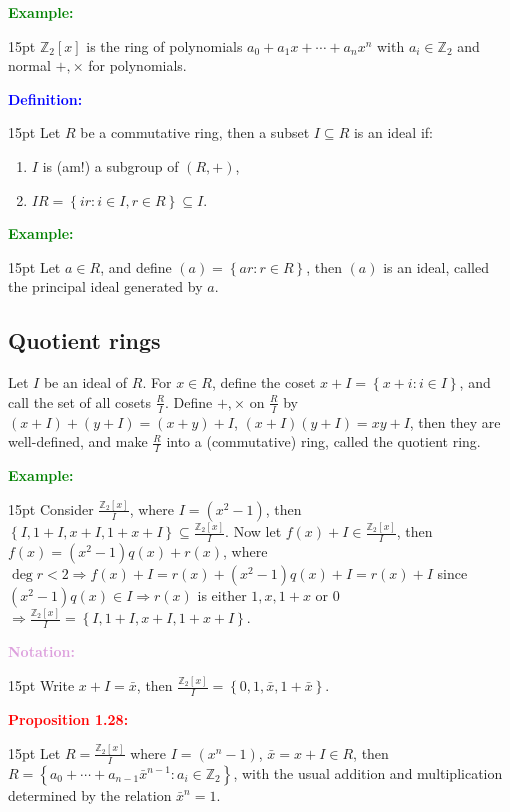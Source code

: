 \documentclass[12pt]{article}
\newcommand{\noparskip}{\vspace{-\parskip}}
\newenvironment{points}
	{\begin{enumerate}[label = (\arabic*)]}
	{\end{enumerate}}
\newenvironment{dent}
	{\begin{adjustwidth}{15pt}{}\noparskip}
	{\end{adjustwidth}}
\newenvironment{result}[1]
	{\textcolor{Red}{\textbf{#1:}}\begin{dent}}
	{\end{dent}}
\newenvironment{definition}
	{\textcolor{Blue}{\textbf{Definition:}}\begin{dent}}
	{\end{dent}}
\newenvironment{notation}
	{\textcolor{Plum}{\textbf{Notation:}}\begin{dent}}
	{\end{dent}}
\newenvironment{example}
	{\textcolor{Green}{\textbf{Example:}}\begin{dent}}
	{\end{dent}}
\renewcommand{\implies}{\Rightarrow}
\newcommand{\set}[1]{\left\{ #1 \right\}}
\newcommand{\Z}{\mathbb{Z}}
\newcommand{\Ztwox}{\Z_2[x]}
\newcommand{\Ztwoxover}[1]{\frac{\Ztwox}{#1}}
\newcommand{\gen}[1]{\left( #1 \right)}
\newcommand{\xbar}{\bar{x}}
\begin{document}
\begin{example}
$\Ztwox$ is the ring of polynomials $a_0 + a_1 x + \cdots + a_n x^n$ with $a_i \in \Z_2$ and normal $+, \times$ for polynomials.
\end{example}

\begin{definition}
Let $R$ be a commutative ring, then a subset $I \subseteq R$ is an ideal if:
\noparskip
\begin{points}
\item $I$ is (am!) a subgroup of $(R, +)$,
\item $IR = \set{ir: i \in I, r \in R} \subseteq I$.
\end{points}
\end{definition}

\begin{example}
Let $a \in R$, and define $\gen{a} = \set{ar: r \in R}$, then $\gen{a}$ is an ideal, called the principal ideal generated by $a$. 
\end{example}

\subsection{Quotient rings}

Let $I$ be an ideal of $R$. For $x \in R$, define the coset $x + I = \set{x + i : i \in I}$, and call the set of all cosets $\frac{R}{I}$. Define $+, \times$ on $\frac{R}{I}$ by $(x + I) + (y + I) = (x + y) + I$, $(x + I)(y + I) = xy + I$, then they are well-defined, and make $\frac{R}{I}$ into a (commutative) ring, called the quotient ring.

\begin{example}
Consider $\Ztwoxover{I}$, where $I = \gen{x^2 - 1}$, then $\set{I, 1 + I, x + I, 1 + x + I} \subseteq \Ztwoxover{I}$. Now let $f(x) + I \in \Ztwoxover{I}$, then $f(x) = (x^2 - 1)q(x) + r(x)$, where $\deg r < 2 \implies f(x) + I = r(x) + (x^2 - 1)q(x) + I = r(x) + I$ since $(x^2 - 1)q(x) \in I \implies r(x)$ is either $1, x, 1 + x$ or 0 $\implies \Ztwoxover{I} = \set{I, 1 + I, x + I, 1 + x + I}$.
\end{example}

\begin{notation}
Write $x + I = \xbar$, then $\Ztwoxover{I} = \set{0, 1, \xbar, 1 + \xbar}$.
\end{notation}

\begin{result}{Proposition 1.28}
Let $R = \Ztwoxover{I}$ where $I = \gen{x^n - 1}$, $\xbar = x + I \in R$, then $R = \set{a_0 + \cdots + a_{n - 1} \xbar^{n - 1}: a_i \in \Z_2}$, with the usual addition and multiplication determined by the relation $\xbar^n = 1$.
\end{result}
\end{document}
